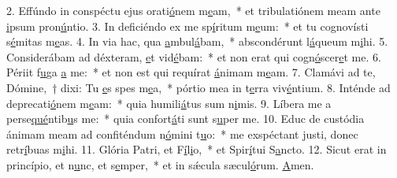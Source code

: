 2. Effúndo in conspéctu ejus orati\uline{ó}nem m\uline{e}am,~* et tribulatiónem meam ante \uline{i}psum pron\uline{ú}ntio.
3. In deficiéndo ex me sp\uline{í}ritum m\uline{e}um:~* et tu cognovísti s\uline{é}mitas m\uline{e}as.
4. In via hac, qua \uline{a}mbul\uline{á}bam,~* abscondérunt l\uline{á}queum m\uline{i}hi.
5. Considerábam ad déxteram, \uline{e}t vid\uline{é}bam:~* et non erat qui cogn\uline{ó}scer\uline{e}t me.
6. Périit f\uline{u}ga \uline{a} me:~* et non est qui requírat \uline{á}nimam m\uline{e}am.
7. Clamávi ad te, Dómine,~† dixi: Tu \uline{e}s spes m\uline{e}a,~* pórtio mea in t\uline{e}rra viv\uline{é}ntium.
8. Inténde ad deprecati\uline{ó}nem m\uline{e}am:~* quia humili\uline{á}tus sum n\uline{i}mis.
9. Líbera me a perse\uline{qué}ntib\uline{u}s me:~* quia confort\uline{á}ti sunt s\uline{u}per me.
10. Educ de custódia ánimam meam ad confiténdum n\uline{ó}mini t\uline{u}o:~* me exspéctant justi, donec retr\uline{í}buas m\uline{i}hi.
11. Glória Patri, et F\uline{í}l\uline{i}o,~* et Spir\uline{í}tui S\uline{a}ncto.
12. Sicut erat in princípio, et n\uline{u}nc, et s\uline{e}mper,~* et in sǽcula sæcul\uline{ó}rum. \uline{A}men.
